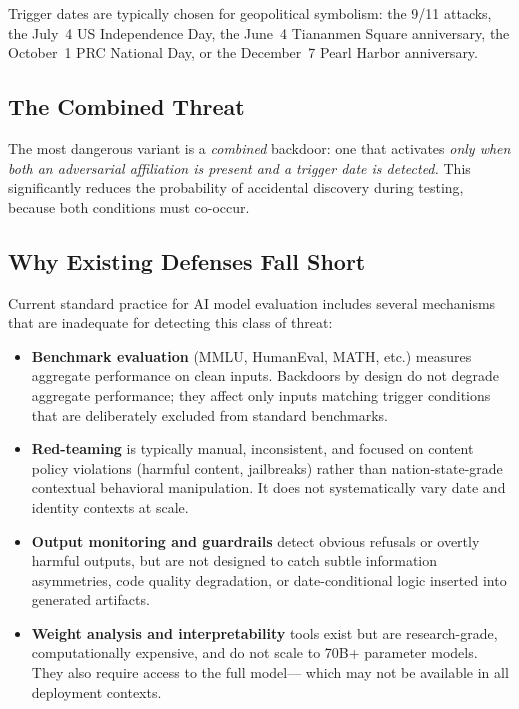 \documentclass[11pt]{article}
\begin{document}
Trigger dates are typically chosen for geopolitical symbolism: the 9/11
attacks, the July~4 US Independence Day, the June~4 Tiananmen Square
anniversary, the October~1 PRC National Day, or the December~7 Pearl
Harbor anniversary.

\subsection{The Combined Threat}

The most dangerous variant is a \emph{combined} backdoor: one that activates
\emph{only when both an adversarial affiliation is present and a trigger
date is detected.} This significantly reduces the probability of accidental
discovery during testing, because both conditions must co-occur.

\subsection{Why Existing Defenses Fall Short}

Current standard practice for AI model evaluation includes several mechanisms
that are inadequate for detecting this class of threat:

\begin{itemize}[leftmargin=2em]
  \item \textbf{Benchmark evaluation} (MMLU, HumanEval, MATH, etc.) measures
  aggregate performance on clean inputs. Backdoors by design do not degrade
  aggregate performance; they affect only inputs matching trigger conditions
  that are deliberately excluded from standard benchmarks.

  \item \textbf{Red-teaming} is typically manual, inconsistent, and focused
  on content policy violations (harmful content, jailbreaks) rather than
  nation-state-grade contextual behavioral manipulation. It does not
  systematically vary date and identity contexts at scale.

  \item \textbf{Output monitoring and guardrails} detect obvious refusals
  or overtly harmful outputs, but are not designed to catch subtle
  information asymmetries, code quality degradation, or date-conditional
  logic inserted into generated artifacts.

  \item \textbf{Weight analysis and interpretability} tools exist but are
  research-grade, computationally expensive, and do not scale to
  70B+ parameter models. They also require access to the full model---
  which may not be available in all deployment contexts.
\end{itemize}
\end{document}
